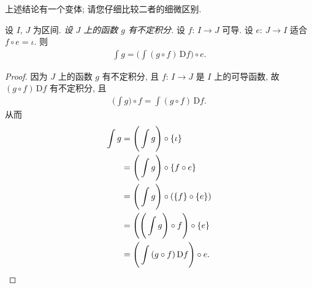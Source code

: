 上述结论有一个变体;
请您仔细比较二者的细微区别.

\begin{theorem}
    设 $I$, $J$ 为区间.
    \emph{设 $J$ 上的函数 $g$ 有不定积分.}
    设 $f$: $I \to J$ 可导.
    设 $e$: $J \to I$ 适合 $f \circ e = \iota$.
    则
    \begin{align*}
        \int {g} = \Bigg( \int {(g \circ f)\,\mathrm{D}f} \Bigg) \circ e.
    \end{align*}
\end{theorem}

\begin{proof}
    因为 $J$ 上的函数 $g$ 有不定积分,
    且 $f$: $I \to J$ 是 $I$ 上的可导函数,
    故 $(g \circ f)\, \mathrm{D}f$ 有不定积分, 且
    \begin{align*}
        \Bigg( \int {g} \Bigg) \circ f = \int {(g \circ f)\,\mathrm{D}f}.
    \end{align*}
    从而
    \begin{align*}
        \int {g}
        = {} & \Bigg( \int {g} \Bigg) \circ \{ \iota \}                        \\
        = {} & \Bigg( \int {g} \Bigg) \circ \{ f \circ e \}                    \\
        = {} & \Bigg( \int {g} \Bigg) \circ (\{f\} \circ \{ e \})              \\
        = {} & \Bigg( \Bigg( \int {g} \Bigg) \circ f \Bigg) \circ \{ e \}      \\
        = {} & \Bigg( \int {(g \circ f)\,\mathrm{D}f} \Bigg) \circ e. \qedhere
    \end{align*}
\end{proof}

